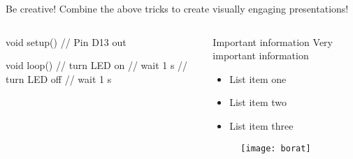 \documentclass{beamer}
\begin{document}
\begin{frame}[fragile]{Be creative!}
Combine the above tricks to create visually engaging presentations!
\begin{columns}[T] %
\begin{column}{.48\textwidth}
\begin{ardu}
void setup() {
     // Pin D13 out
}

void loop() {
     // turn LED on
     // wait 1 s
     // turn LED off
     // wait 1 s
}
\end{ardu}
\end{column}
\begin{column}{.48\textwidth}
\begin{block}{Important information}
Very important information
\end{block}
\begin{itemize}
\item List item one
\item List item two
\item List item three
\end{itemize}
\begin{figure}
\centering
  \texttt{[image: borat]}\\
\end{figure}
\end{column}%
\end{columns}
\end{frame}
\end{document}
